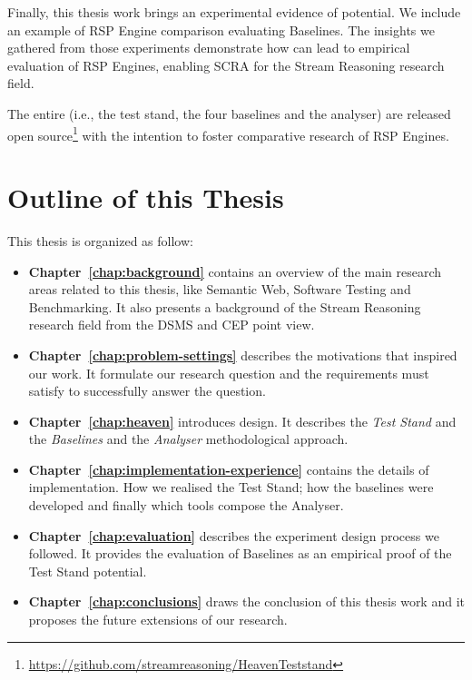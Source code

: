 Finally, this thesis work brings an experimental evidence of \name potential. We include an example of RSP Engine comparison evaluating \name Baselines. %
The insights we gathered from those experiments demonstrate how \name can lead to empirical evaluation of RSP Engines, enabling SCRA for the Stream Reasoning research field.

The entire \name (i.e., the test stand, the four baselines and the analyser) are released open source\footnote{\url{https://github.com/streamreasoning/HeavenTeststand}} with the intention to foster comparative research of RSP Engines.

\section{Outline of this Thesis}\label{sec:thesis-structure-intro}

This thesis is organized as follow:

\begin{itemize}

\item \textbf{Chapter~\ref{chap:background}} contains an overview of the main research areas related to this thesis, like Semantic Web, Software Testing and Benchmarking. It also presents a background of the Stream Reasoning research field from the DSMS and CEP point view.
\item \textbf{Chapter~\ref{chap:problem-settings}} describes the motivations that inspired our work. It formulate our research question and the requirements \name must satisfy to successfully answer the question.
\item \textbf{Chapter~\ref{chap:heaven}} introduces \name design. It describes the \textit{Test Stand} and the \textit{Baselines} and the \textit{Analyser} methodological approach.
\item \textbf{Chapter~\ref{chap:implementation-experience}} contains the details of \name implementation. How we realised the Test Stand; how the baselines were developed and finally which tools compose the Analyser.
\item \textbf{Chapter~\ref{chap:evaluation}} describes the experiment design process we followed. It provides the evaluation of \name Baselines as an empirical proof of the Test Stand potential.
\item \textbf{Chapter~\ref{chap:conclusions}} draws the conclusion of this thesis work and it proposes the future extensions of our research.
\end{itemize}